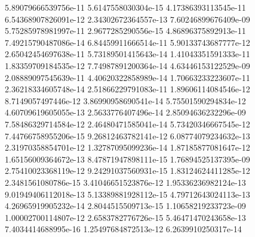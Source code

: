 5.89079666539756e-11	5.6147558030304e-15	4.17386393113545e-11	6.54368907826091e-12	2.34302672364557e-13	7.60246899676409e-09	5.75285978981997e-11	2.9677285290556e-15	4.86896375892913e-11	7.49215790487086e-14	6.84459911666514e-11	5.90133743687777e-12
2.65042454697638e-11	5.73189501415643e-14	1.41043351591333e-11	1.83359709184535e-12	7.74987891200364e-14	4.63446153122529e-09	2.08889097545639e-11	4.40620322858989e-14	1.70663233223607e-11	2.36218334605748e-14	2.51866229791083e-11	1.89606114084546e-12
8.7149057497446e-12	3.86990958690541e-14	5.75501590294834e-12	4.60709619605055e-13	2.5633776407496e-14	2.85094636232296e-09	7.58486329714584e-12	2.46480471585041e-14	5.73420346667545e-12	7.44766758955206e-15	9.26812463782141e-12	6.08774079234632e-13
2.31970358854701e-12	1.32787095099236e-14	1.87185877081647e-12	1.65156009364672e-13	8.47871947898111e-15	1.76894525137395e-09	2.75410023368119e-12	9.24291037560931e-15	1.83124624411285e-12	2.3481561080786e-15	3.41046651523876e-12	1.95336236982124e-13
9.01949406112018e-13	5.13389881928112e-15	4.79712643024113e-13	4.26965919905232e-14	2.8044515509713e-15	1.10658219233723e-09	1.00002700114807e-12	2.6583782776726e-15	5.46471470243658e-13	7.4034414688995e-16	1.25497684872513e-12	6.2639910250317e-14
